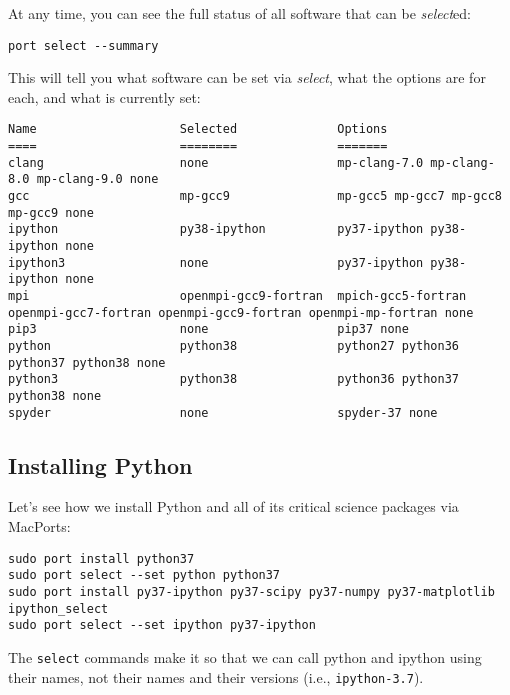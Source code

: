\documentclass[12pt, letterpaper]{article}
\begin{document}
At any time, you can see the full status of all software that can be \emph{select}ed:
\begin{verbatim}
port select --summary
\end{verbatim}
This will tell you what software can be set via \emph{select}, what the options
are for each, and what is currently set:
\begin{verbatim}
Name                    Selected              Options
====                    ========              =======
clang                   none                  mp-clang-7.0 mp-clang-8.0 mp-clang-9.0 none
gcc                     mp-gcc9               mp-gcc5 mp-gcc7 mp-gcc8 mp-gcc9 none
ipython                 py38-ipython          py37-ipython py38-ipython none
ipython3                none                  py37-ipython py38-ipython none
mpi                     openmpi-gcc9-fortran  mpich-gcc5-fortran openmpi-gcc7-fortran openmpi-gcc9-fortran openmpi-mp-fortran none
pip3                    none                  pip37 none
python                  python38              python27 python36 python37 python38 none
python3                 python38              python36 python37 python38 none
spyder                  none                  spyder-37 none

\end{verbatim}

\subsection{Installing Python}
\label{sec:python}
Let's see how we install Python and all of its critical science
packages via MacPorts:
\begin{verbatim}
sudo port install python37
sudo port select --set python python37
sudo port install py37-ipython py37-scipy py37-numpy py37-matplotlib ipython_select
sudo port select --set ipython py37-ipython
\end{verbatim}

The {\tt select} commands make it so that we can call python and ipython
using their names, not their names and their versions (i.e., {\tt ipython-3.7}).
\end{document}
